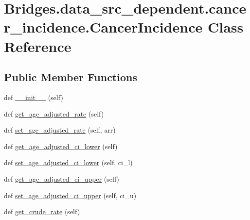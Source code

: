 \hypertarget{class_bridges_1_1data__src__dependent_1_1cancer__incidence_1_1_cancer_incidence}{}\section{Bridges.\+data\+\_\+src\+\_\+dependent.\+cancer\+\_\+incidence.\+Cancer\+Incidence Class Reference}
\label{class_bridges_1_1data__src__dependent_1_1cancer__incidence_1_1_cancer_incidence}
\subsection*{Public Member Functions}
\begin{DoxyCompactItemize}
\item 
def \hyperlink{class_bridges_1_1data__src__dependent_1_1cancer__incidence_1_1_cancer_incidence_a644cf30007b6d60cd77d8431d60a3bf8}{\+\_\+\+\_\+init\+\_\+\+\_\+} (self)
\item 
def \hyperlink{class_bridges_1_1data__src__dependent_1_1cancer__incidence_1_1_cancer_incidence_a8520008eae3c2a116c106e176771adee}{get\+\_\+age\+\_\+adjusted\+\_\+rate} (self)
\item 
def \hyperlink{class_bridges_1_1data__src__dependent_1_1cancer__incidence_1_1_cancer_incidence_a4666122daa435e60c79adf2ee9d9af7c}{set\+\_\+age\+\_\+adjusted\+\_\+rate} (self, arr)
\item 
def \hyperlink{class_bridges_1_1data__src__dependent_1_1cancer__incidence_1_1_cancer_incidence_a7c9ee6a1439ef89d80ef181c3c315128}{get\+\_\+age\+\_\+adjusted\+\_\+ci\+\_\+lower} (self)
\item 
def \hyperlink{class_bridges_1_1data__src__dependent_1_1cancer__incidence_1_1_cancer_incidence_adeda2deb8f14e95ff8bbb74c034bdd4b}{set\+\_\+age\+\_\+adjusted\+\_\+ci\+\_\+lower} (self, ci\+\_\+l)
\item 
def \hyperlink{class_bridges_1_1data__src__dependent_1_1cancer__incidence_1_1_cancer_incidence_ae201e925aad2497101f7da3e9c83250b}{get\+\_\+age\+\_\+adjusted\+\_\+ci\+\_\+upper} (self)
\item 
def \hyperlink{class_bridges_1_1data__src__dependent_1_1cancer__incidence_1_1_cancer_incidence_ac31e00964f119b9e133c36c3a66f7539}{set\+\_\+age\+\_\+adjusted\+\_\+ci\+\_\+upper} (self, ci\+\_\+u)
\item 
def \hyperlink{class_bridges_1_1data__src__dependent_1_1cancer__incidence_1_1_cancer_incidence_ae8fb1bd691afee9aaeac2503f5905829}{get\+\_\+crude\+\_\+rate} (self)

\end{DoxyCompactItemize}
